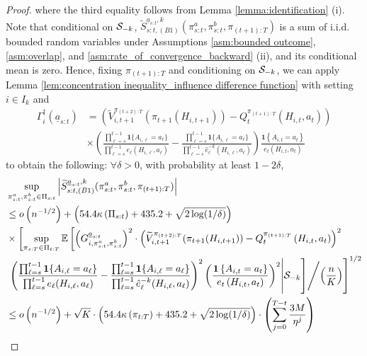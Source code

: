\begin{proof}
where the third equality follows from Lemma \ref{lemma:identification} (i). Note that conditional on $\mathcal{S}_{-k}$, $\widetilde{S}_{s:t,(B1)}^{\underline{a}_{s:t},k}(\pi_{s:t}^{a},\pi_{s:t}^{b},\pi_{(t+1):T})$ is a sum of i.i.d. bounded random variables under Assumptions \ref{asm:bounded outcome}, \ref{asm:overlap}, and \ref{asm:rate_of_convergence_backward} (ii), and its conditional mean is zero.
Hence, fixing $\pi_{(t+1):T}$ and conditioning on $\mathcal{S}_{-k}$, we can apply Lemma \ref{lem:concentration inequality_influence difference function} with setting $i \in I_k$ and 
\begin{align*}
    \Gamma_{i}^{\dag}(\underline{a}_{s:t})&=	\left(\widetilde{V}_{i,t+1}^{\pi_{(t+2):T}}(\pi_{t+1}(H_{i,t+1}))-Q_{t}^{\pi_{(t+1):T}}\left(H_{i,t},a_{t}\right)\right) \\
&\times \left(\frac{\prod_{\ell=s}^{t-1}\mathbf{1}\{A_{i,\ell}=a_{\ell}\}}{\prod_{\ell=s}^{t-1}e_{\ell}(H_{i,\ell},a_{\ell})}-\frac{\prod_{\ell=s}^{t-1}\mathbf{1}\{A_{i,\ell}=a_{\ell}\}}{\prod_{\ell=s}^{t-1}\hat{e}_{\ell}^{-k}(H_{i,\ell},a_{\ell})}\right)\frac{\mathbf{1}\left\{ A_{i,t}=a_{t}\right\} }{e_{t}\left(H_{i,t},a_{t}\right)}
\end{align*}
to obtain the following: $\forall \delta > 0$, with probability at least $1-2\delta$,
\begin{align*}
    	&\sup_{\pi_{s:t}^{a},\pi_{s:t}^{b}\in\Pi_{s:t}}\left|\widetilde{S}_{s:t,(B1)}^{\underline{a}_{s:t},k}(\pi_{s:t}^{a},\pi_{s:t}^{b},\pi_{(t+1):T})\right| \\
&\leq	o\left(n^{-1/2}\right)+\left(54.4\kappa\left(\Pi_{s:t}\right)+435.2+\sqrt{2\log(1/\delta)}\right) \\
&\times	\left[\sup_{\pi_{s:T}\in\Pi_{t:T}}\E\left[\left(G_{i,\pi_{s:t}^{a},\pi_{s:t}^{b}}^{\underline{a}_{s:t}}\right)^{2}\cdot\left(\widetilde{V}_{i,t+1}^{\pi_{(t+2):T}}(\pi_{t+1}(H_{i,t+1}))-Q_{t}^{\pi_{(t+1):T}}\left(H_{i,t},a_{t}\right)\right)^{2}\right.\right.\\
&\left.\left. \left(\frac{\prod_{\ell=s}^{t-1}\mathbf{1}\{A_{i,\ell}=a_{\ell}\}}{\prod_{\ell=s}^{t-1}e_{\ell}(H_{i,\ell},a_{\ell})}-\frac{\prod_{\ell=s}^{t-1}\mathbf{1}\{A_{i,\ell}=a_{\ell}\}}{\prod_{\ell=s}^{t-1}\hat{e}_{\ell}^{-k}(H_{i,\ell},a_{\ell})}\right)^{2}\left(\frac{\mathbf{1}\left\{ A_{i,t}=a_{t}\right\} }{e_{t}\left(H_{i,t},a_{t}\right)}\right)^{2}\middle| \MS_{-k} \right]\middle/ \left(\frac{n}{K}\right)\right]^{1/2} \\
&\leq	o\left(n^{-1/2}\right)+\sqrt{K}\cdot\left(54.4\kappa\left(\pi_{t:T}\right)+435.2+\sqrt{2\log(1/\delta)}\right)\cdot\left(\sum_{j=0}^{T-t}\frac{3M}{\eta^j}\right) \\

\end{align*}
\end{proof}
